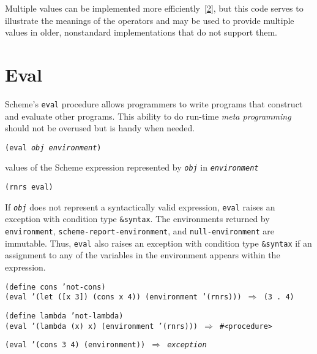 Multiple values can be implemented more
efficiently [\hyperref[bibliography_g220]{2}], but this
code serves to illustrate the meanings of the operators
and may be used to provide multiple values in older, nonstandard
implementations that do not support them.



\section{\label{control_g105}\label{control_h9}Eval\label{control_SECTEVAL}}



Scheme's \texttt{eval} procedure allows programmers to write
programs that construct and evaluate other programs.
This ability to do run-time \textit{meta programming} should not be
overused but is handy when needed.

\begin{description}

\label{control_s80}\item[procedure] \texttt{(eval \textit{obj} \textit{environment})}



\item[returns] values of the Scheme expression represented by \texttt{\textit{obj}} in \texttt{\textit{environment}}


\item[libraries] \texttt{(rnrs eval)}
\end{description}


If \texttt{\textit{obj}} does not represent a syntactically valid expression, \texttt{eval}
raises an exception with condition type \texttt{\&{}syntax}.
The environments returned by \texttt{environment},
\texttt{scheme-report-environment}, and \texttt{null-environment} are
immutable.
Thus, \texttt{eval} also raises an exception with condition type
\texttt{\&{}syntax} if an assignment to any of the variables in the
environment appears within the expression.


\begin{alltt}
(define cons 'not-cons)
(eval '(let ([x 3]) (cons x 4)) (environment '(rnrs))) \(\Rightarrow\) (3 . 4)

(define lambda 'not-lambda)
(eval '(lambda (x) x) (environment '(rnrs))) \(\Rightarrow\) \#{}\textless{}procedure\textgreater{}

(eval '(cons 3 4) (environment)) \(\Rightarrow\) \textit{exception}
\end{alltt}

